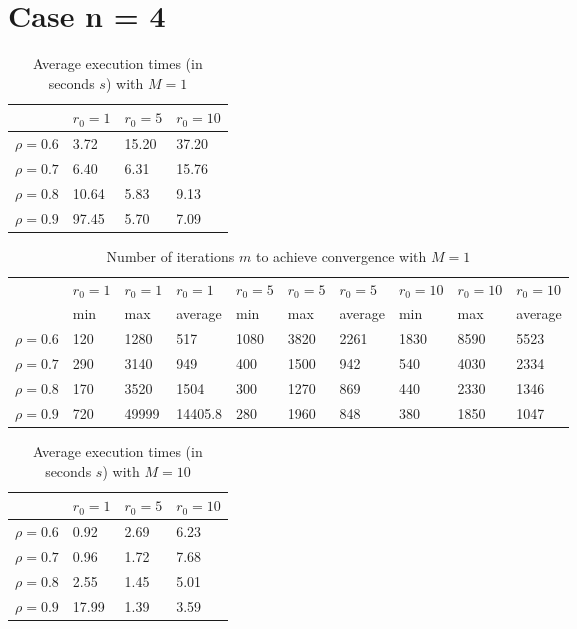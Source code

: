 \documentclass[a4paper,11pt,openright]{report}
\begin{document}
\section*{Case n = 4} 
\begin{table}[H]
\centering
\addtolength{\leftskip}{-1.5cm}
\addtolength{\rightskip}{-1.5cm}
\begin{tabular}{|c|lll|}
\hline
$ $ & $r_0 = 1$ & $r_0 = 5$ & $r_0 = 10$ \\
\hline
$\rho = 0.6$ & 3.72 & 15.20 & 37.20 \\

$\rho = 0.7$ & 6.40 & 6.31 & 15.76 \\

$\rho = 0.8$ & 10.64 & 5.83 & 9.13 \\

$\rho = 0.9$ & 97.45 & 5.70 & 7.09 \\
\hline
\end{tabular}
\caption{Average execution
 times (in seconds $s$) with $M = 1$}
\end{table}
\begin{table}[H]
\centering
\addtolength{\leftskip}{-1.5cm}
\addtolength{\rightskip}{-1.5cm}
\begin{tabular}{|c|lllllllll|}
\hline
$ $ & $r_0 = 1$ & $r_0 = 1$ & $r_0 = 1$ & $r_0 = 5$ & $r_0 = 5$ & $r_0 = 5$ & $r_0 = 10$ & $r_0 = 10$ & $r_0 = 10$  \\
$ $ & min & max & average & min & max & average & min & max & average \\ 
\hline
$\rho = 0.6$ & 120 & 1280 & 517 & 1080 & 3820 & 2261 & 1830 & 8590 & 5523 \\

$\rho = 0.7$ & 290 & 3140 & 949 & 400 & 1500 & 942 & 540 & 4030 & 2334\\

$\rho = 0.8$ & 170 & 3520 & 1504 & 300 & 1270 & 869 & 440 & 2330 & 1346\\

$\rho = 0.9$ & 720 & 49999 & 14405.8 & 280 & 1960 & 848 & 380 & 1850 & 1047\\
\hline
\end{tabular}
\caption{Number of iterations $m$ to achieve convergence with $M = 1$}
\end{table}
\begin{table}[H]
\centering
\addtolength{\leftskip}{-1.5cm}
\addtolength{\rightskip}{-1.5cm}
\begin{tabular}{|c|lll|}
\hline
$ $ & $r_0 = 1$ & $r_0 = 5$ & $r_0 = 10$ \\
\hline
$\rho = 0.6$ & 0.92 & 2.69 & 6.23 \\

$\rho = 0.7$ & 0.96 & 1.72 & 7.68 \\

$\rho = 0.8$ & 2.55 & 1.45 & 5.01 \\

$\rho = 0.9$ & 17.99 & 1.39 & 3.59 \\
\hline
\end{tabular}
\caption{Average execution
 times (in seconds $s$) with $M = 10$}
\end{table}
\end{document}
